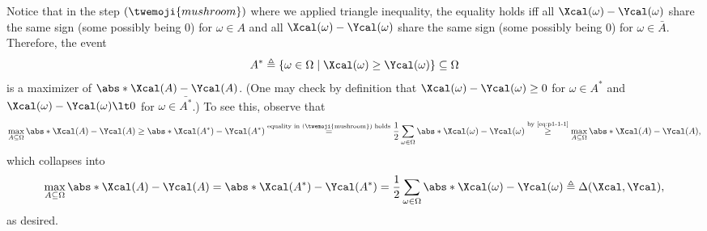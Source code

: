 \begin{answer}[i]
    Notice that in the step $(\twemoji{mushroom})$ where we applied triangle inequality, the equality holds iff all $\Xcal(\omega)-\Ycal(\omega)$ share the same sign (some possibly being $0$) for $\omega\in A$ and all $\Xcal(\omega)-\Ycal(\omega)$ share the same sign (some possibly being $0$) for $\omega\in \bar{A}$.
    Therefore, the event
    \begin{equation}\label{eq:p1-1-2}
        A^\ast\triangleq \{\omega\in\Omega\mid \Xcal(\omega)\ge \Ycal(\omega)\}\subseteq \Omega
    \end{equation}
    is a maximizer of $\abs*{\Xcal(A)-\Ycal(A)}$. 
    (One may check by definition that $\Xcal(\omega)-\Ycal(\omega)\ge 0$ for $\omega\in A^\ast$ and $\Xcal(\omega)-\Ycal(\omega)\lt 0$ for $\omega\in \bar{A^\ast}$.)
    To see this, observe that
    \[
        \max_{A\subseteq \Omega}\abs*{\Xcal(A)-\Ycal(A)} 
        \ge\abs*{\Xcal(A^\ast)-\Ycal(A^\ast)} 
        \stackrel{\textrm{equality in (\twemoji{mushroom}) holds}}= \frac{1}{2}\sum_{\omega\in\Omega}\abs*{\Xcal(\omega)-\Ycal(\omega)}
        \stackrel{\textrm{by \eqref{eq:p1-1-1}}}\ge \max_{A\subseteq \Omega}\abs*{\Xcal(A)-\Ycal(A)},
    \]
    which collapses into
    \begin{equation}\label{eq:p1-1-3}
        \max_{A\subseteq \Omega}\abs*{\Xcal(A)-\Ycal(A)}  
        = \abs*{\Xcal(A^\ast)-\Ycal(A^\ast)} 
        = \frac{1}{2}\sum_{\omega\in\Omega}\abs*{\Xcal(\omega)-\Ycal(\omega)}
        \triangleq \Delta(\Xcal, \Ycal),
    \end{equation}
    as desired.
    
\end{answer}




